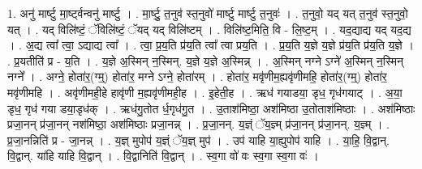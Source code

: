 \documentclass[17pt]{extarticle}
\begin{document}
1. अनु॑ मार्ष्टु मा॒र्ष्ट्वन्वनु॑ मार्ष्टु । . मा॒र्ष्टु॒ त॒नुव॑ स्त॒नुवो॑ मार्ष्टु मार्ष्टु त॒नुवः॑ । . त॒नुवो॒ यद् यत् त॒नुव॑ स्त॒नुवो॒ यत् । . यद् विलि॑ष्टं॒ ॅविलि॑ष्टं॒ ॅयद् यद् विलि॑ष्टम् । . विलि॑ष्ट॒मिति॒ वि - लि॒ष्ट॒म् । . यद॒द्याद्य यद् यद॒द्य । . अ॒द्य त्वा᳚ त्वा॒ ऽद्याद्य त्वा᳚ । . त्वा॒ प्र॒य॒ति प्र॑य॒ति त्वा᳚ त्वा प्रय॒ति । . प्र॒य॒ति य॒ज्ञे य॒ज्ञे प्र॑य॒ति प्र॑य॒ति य॒ज्ञे । . प्र॒यतीति॑ प्र - य॒ति । . य॒ज्ञे अ॒स्मिन् न॒स्मिन्. य॒ज्ञे य॒ज्ञे अ॒स्मिन्न् । . अ॒स्मिन् नग्ने ऽग्ने॑ अ॒स्मिन् न॒स्मिन् नग्ने᳚ । . अग्ने॒ होता॑र॒(ग्म्॒) होता॑र॒ मग्ने ऽग्ने॒ होता॑रम् । . होता॑र॒ मवृ॑णीम॒ह्यवृ॑णीमहि॒ होता॑र॒(ग्म्॒) होता॑र॒ मवृ॑णीमहि । . अवृ॑णीमही॒हे हावृ॑णी म॒ह्यवृ॑णीमही॒ह । . इ॒हेती॒ह । . ऋध॑ गयाडया॒ डृध॒ गृध॑गयाट् । . अ॒या॒ डृध॒ गृध॑ गया डया॒डृध॑क् । . ऋध॑गु॒तोत र्ध॒गृध॑गु॒त । . उ॒ताश॑मिष्ठा॒ अश॑मिष्ठा उ॒तोताश॑मिष्ठाः । . अश॑मिष्ठाः प्रजा॒नन् प्र॑जा॒नन् नश॑मिष्ठा॒ अश॑मिष्ठाः प्रजा॒नन्न् । . प्र॒जा॒नन्. य॒ज्ञ्ं ॅय॒ज्ञ्म् प्र॑जा॒नन् प्र॑जा॒नन्. य॒ज्ञ्म् । . प्र॒जा॒नन्निति॑ प्र - जा॒नन्न् । . य॒ज्ञ् मुपोप॑ य॒ज्ञ्ं ॅय॒ज्ञ् मुप॑ । . उप॑ याहि या॒ह्युपोप॑ याहि । . या॒हि॒ वि॒द्वान्. वि॒द्वान्. या॑हि याहि वि॒द्वान् । . वि॒द्वानिति॑ वि॒द्वान् । . स्व॒गा वो॑ वः स्व॒गा स्व॒गा वः॑ । \newline
\end{document}
